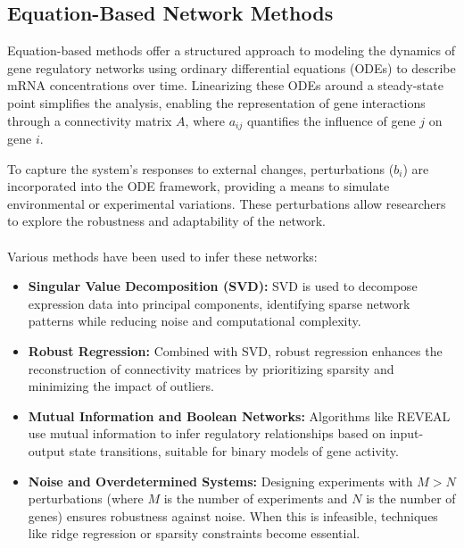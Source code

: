 \subsection{Equation-Based Network Methods}\label{subsec:equation-based-network-methods}
Equation-based methods offer a structured approach to modeling the dynamics of gene regulatory networks using ordinary differential equations (ODEs) to describe mRNA concentrations over time.
Linearizing these ODEs around a steady-state point simplifies the analysis, enabling the representation of gene interactions through a connectivity matrix \(A\), where \(a_{ij}\) quantifies the influence of gene \(j\) on gene \(i\)\cite{deng_molecular_2012}.


\noindent To capture the system's responses to external changes, perturbations (\(b_i\)) are incorporated into the ODE framework, providing a means to simulate environmental or experimental variations\cite{yeung_reverse_2002}.
These perturbations allow researchers to explore the robustness and adaptability of the network.
\\\\
\noindent Various methods have been used to infer these networks:

\begin{itemize}

    \item \textbf{Singular Value Decomposition (SVD):} SVD is used to decompose expression data into principal components, identifying sparse network patterns while reducing noise and computational complexity\cite{yeung_reverse_2002}.

    \item \textbf{Robust Regression:} Combined with SVD, robust regression enhances the reconstruction of connectivity matrices by prioritizing sparsity and minimizing the impact of outliers\cite{yeung_reverse_2002}.

    \item \textbf{Mutual Information and Boolean Networks:} Algorithms like REVEAL use mutual information to infer regulatory relationships based on input-output state transitions, suitable for binary models of gene activity\cite{akutsu_identification_1998}.

    \item \textbf{Noise and Overdetermined Systems:} Designing experiments with \(M > N\) perturbations (where \(M\) is the number of experiments and \(N\) is the number of genes) ensures robustness against noise.
    When this is infeasible, techniques like ridge regression or sparsity constraints become essential\cite{yeung_reverse_2002}.

\end{itemize}



